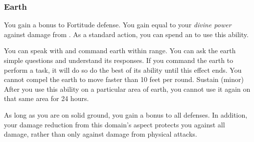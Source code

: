         \subsubsection{Earth}
             You gain a  bonus to Fortitude defense.
             You gain  equal to your \textit{divine power} against damage from .
             As a standard action, you can spend an  to use this ability.
            \begin{ability}
                \begin{spelltargetinginfo}
                    \spellrng{\rnglong}
                \end{spelltargetinginfo}
                \begin{spelleffects}
                    \spelleffect You can speak with and command earth within range.
                    You can ask the earth simple questions and understand its responses.
                    If you command the earth to perform a task, it will do so do the best of its ability until this effect ends.
                    You cannot compel the earth to move faster than 10 feet per round.
                    \spelldur Sustain (minor)
                    \spellspecial After you use this ability on a particular area of earth, you cannot use it again on that same area for 24 hours.
                \end{spelleffects}
            \end{ability}
             As long as you are on solid ground, you gain a  bonus to all defenses.
            In addition, your damage reduction from this domain's aspect protects you against all damage, rather than only against damage from physical attacks.

